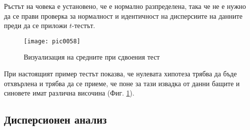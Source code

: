 Ръстът на човека е установено, че е нормално разпределена, така че не е нужно да се прави проверка за нормалност и идентичност на дисперсиите на данните преди да се приложи $t$-тестът. 

\begin{figure}[h!]
  \centering
  \texttt{[image: pic0058]}
  \caption{Визуализация на средните при сдвоения тест}
\label{figure0058}
\end{figure}
\FloatBarrier

При настоящият пример тестът показва, че нулевата хипотеза трябва да бъде отхвърлена и трябва да се приеме, че поне за тази извадка от данни бащите и синовете имат различна височина (Фиг. \ref{figure0058}). 

\subsection{Дисперсионен анализ}



